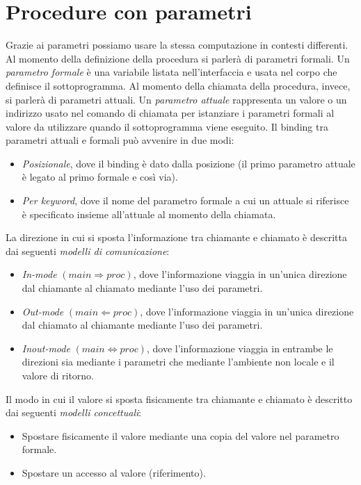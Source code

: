 \documentclass[a4paper,oneside,titlepage]{book}
\begin{document}
\section{Procedure con parametri}
Grazie ai parametri possiamo usare la stessa computazione in contesti differenti. Al momento della definizione della procedura si parlerà di parametri formali. Un \textit{parametro formale} è una variabile listata nell'interfaccia e usata nel corpo che definisce il sottoprogramma. Al momento della chiamata della procedura, invece, si parlerà di parametri attuali. Un \textit{parametro attuale} rappresenta un valore o un indirizzo usato nel comando di chiamata per istanziare i parametri formali al valore da utilizzare quando il sottoprogramma viene eseguito. Il binding tra parametri attuali e formali può avvenire in due modi:
\begin{itemize}
	\item \textit{Posizionale}, dove il binding è dato dalla posizione (il primo parametro attuale è legato al primo formale e così via).
	\item \textit{Per keyword}, dove il nome del parametro formale a cui un attuale si riferisce è specificato insieme all'attuale al momento della chiamata.
\end{itemize}
La direzione in cui si sposta l'informazione tra chiamante e chiamato è descritta dai seguenti \textit{modelli di comunicazione}:
\begin{itemize}
	\item \textit{In-mode} $(main \Rightarrow proc)$, dove l'informazione viaggia in un'unica direzione dal chiamante al chiamato mediante l'uso dei parametri.
	\item \textit{Out-mode} $(main \Leftarrow proc)$, dove l'informazione viaggia in un'unica direzione dal chiamato al chiamante mediante l'uso dei parametri.
	\item \textit{Inout-mode} $(main \Leftrightarrow proc)$, dove l'informazione viaggia in entrambe le direzioni sia mediante i parametri che mediante l'ambiente non locale e il valore di ritorno.
\end{itemize}
Il modo in cui il valore si sposta fisicamente tra chiamante e chiamato è descritto dai seguenti \textit{modelli concettuali}:
\begin{itemize}
	\item Spostare fisicamente il valore mediante una copia del valore nel parametro formale.
	\item Spostare un accesso al valore (riferimento).
\end{itemize}
\end{document}
